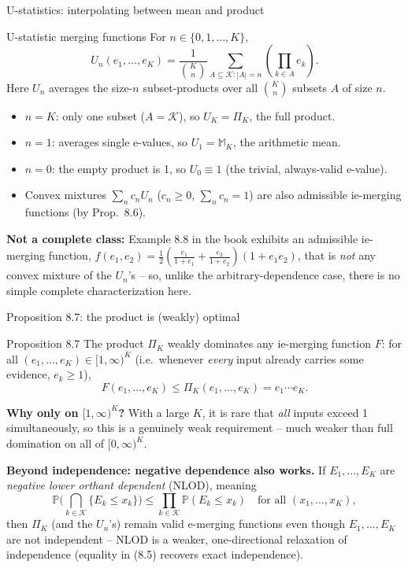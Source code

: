 \documentclass[aspectratio=169,10pt]{beamer}
\newcommand{\Pb}{\mathbb{P}}
\newcommand{\calK}{\mathcal{K}}
\begin{document}
\begin{frame}{U-statistics: interpolating between mean and product}
  \begin{block}{U-statistic merging functions}
    For $n \in \{0,1,\dots,K\}$,
    \[
      U_n(e_1,\dots,e_K) = \frac{1}{\binom{K}{n}}\sum_{A \subseteq \calK : |A|=n} \left(\prod_{k \in A} e_k\right).
    \]
    Here $U_n$ averages the size-$n$ subset-products over all $\binom{K}{n}$ subsets $A$ of size $n$.
  \end{block}
  \begin{itemize}
    \item $n=K$: only one subset ($A=\calK$), so $U_K = \Pi_K$, the full product.
    \item $n=1$: averages single e-values, so $U_1 = \mathbb{M}_K$, the arithmetic mean.
    \item $n=0$: the empty product is 1, so $U_0 \equiv 1$ (the trivial, always-valid e-value).
    \item Convex mixtures $\sum_n c_n U_n$ ($c_n \geq 0$, $\sum_n c_n=1$) are also admissible ie-merging functions (by Prop.\ 8.6).
  \end{itemize}
  \textbf{Not a complete class:} Example 8.8 in the book exhibits an admissible ie-merging function, $f(e_1,e_2) = \tfrac12\left(\tfrac{e_1}{1+e_1}+\tfrac{e_2}{1+e_2}\right)(1+e_1e_2)$, that is \emph{not} any convex mixture of the $U_n$'s -- so, unlike the arbitrary-dependence case, there is no simple complete characterization here.
\end{frame}

\begin{frame}{Proposition 8.7: the product is (weakly) optimal}
  \begin{block}{Proposition 8.7}
    The product $\Pi_K$ weakly dominates any ie-merging function $F$: for all $(e_1,\dots,e_K) \in [1,\infty)^K$ (i.e.\ whenever \emph{every} input already carries some evidence, $e_k \geq 1$),
    \[
      F(e_1,\dots,e_K) \leq \Pi_K(e_1,\dots,e_K) = e_1 \cdots e_K.
    \]
  \end{block}
  \textbf{Why only on $[1,\infty)^K$?} With a large $K$, it is rare that \emph{all} inputs exceed 1 simultaneously, so this is a genuinely weak requirement -- much weaker than full domination on all of $[0,\infty)^K$.

  \vspace{0.2cm}
  \textbf{Beyond independence: negative dependence also works.} If $E_1,\dots,E_K$ are \emph{negative lower orthant dependent} (NLOD), meaning
  \[
    \Pb\Big(\bigcap_{k \in \calK} \{E_k \leq x_k\}\Big) \leq \prod_{k \in \calK} \Pb(E_k \leq x_k) \quad \text{for all } (x_1,\dots,x_K),
  \]
  then $\Pi_K$ (and the $U_n$'s) remain valid e-merging functions even though $E_1,\dots,E_K$ are not independent -- NLOD is a weaker, one-directional relaxation of independence (equality in (8.5) recovers exact independence).
\end{frame}
\end{document}
